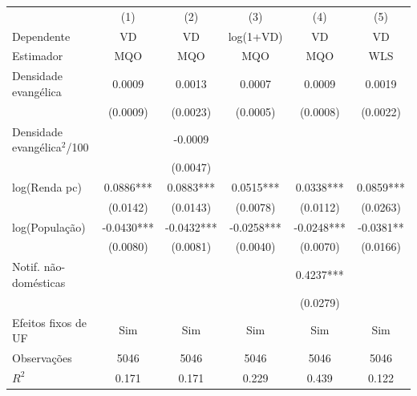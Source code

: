 \begin{tabular}{lccccc}
\toprule
& (1) & (2) & (3) & (4) & (5) \\
Dependente & VD & VD & log(1+VD) & VD & VD \\
Estimador & MQO & MQO & MQO & MQO & WLS \\
\midrule
Densidade evangélica & 0.0009 & 0.0013 & 0.0007 & 0.0009 & 0.0019 \\
 & (0.0009) & (0.0023) & (0.0005) & (0.0008) & (0.0022) \\
Densidade evangélica$^2$/100 &  & -0.0009 &  &  &  \\
 &  & (0.0047) &  &  &  \\
log(Renda pc) & 0.0886*** & 0.0883*** & 0.0515*** & 0.0338*** & 0.0859*** \\
 & (0.0142) & (0.0143) & (0.0078) & (0.0112) & (0.0263) \\
log(População) & -0.0430*** & -0.0432*** & -0.0258*** & -0.0248*** & -0.0381** \\
 & (0.0080) & (0.0081) & (0.0040) & (0.0070) & (0.0166) \\
Notif. não-domésticas &  &  &  & 0.4237*** &  \\
 &  &  &  & (0.0279) &  \\
\midrule
Efeitos fixos de UF & Sim & Sim & Sim & Sim & Sim \\
Observações & 5046 & 5046 & 5046 & 5046 & 5046 \\
$R^2$ & 0.171 & 0.171 & 0.229 & 0.439 & 0.122 \\
\bottomrule
\end{tabular}
